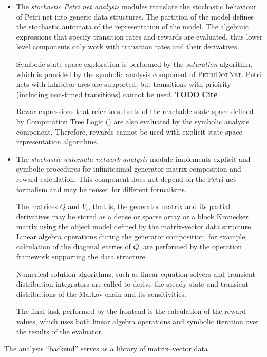 \begin{itemize}
\item The \emph{stochastic Petri net analysis} modules translate the
  stochastic behaviour of Petri net into generic data structures. The
  partition of the model defines the stochastic automata of the
   representation of the model. The algebraic expressions
  that specify transition rates and rewards are evaluated, thus lower
  level components only work with transition rates and their
  derivatives.

  Symbolic state space exploration is performed by the
  \emph{saturation} algorithm, which is provided by the symbolic
  analysis component of \textsc{PetriDotNet}. Petri nets with inhibitor
  arcs are supported, but transitions with prioirity (including
  non-timed transitions) cannot be used. \textbf{TODO Cite}

  Rewar expressions that refer to subsets of the reachable state space
  defined by Computation Tree Logic () are also evaluated
  by the symbolic analysis component. Therefore,  rewards
  cannot be used with explicit state space representation algorithms.

\item The \emph{stochastic automata network analysis} module
  implements explicit and symbolic procedures for infinitesimal
  generator matrix composition and reward calculation. This component
  does not depend on the Petri net formalism and may be reused for
  different formalisms.

  The matrices $Q$ and $V_i$, that is, the generator matrix and its
  partial derivatives may be stored as a dense or sparse array or a
  block Kronecker matrix using the object model defined by the
  matrix-vector data structure. Linear algebra operations during the
  generator composition, for example, calculation of the diagonal
  entries of $Q$, are performed by the operation framework supporting
  the data structure.

  Numerical solution algorithms, such as linear equation solvers and
  transient distribution integrators are called to derive the steady
  state and transient distributions of the Markov chain and its
  sensitivities.

  The final task performed by the frontend is the calculation of the
  reward values, which uses both linear algebra operations and
  symbolic iteration over the results of the  evaluator.
\end{itemize}
The analysis ``backend'' serves as a library of matrix--vector data
